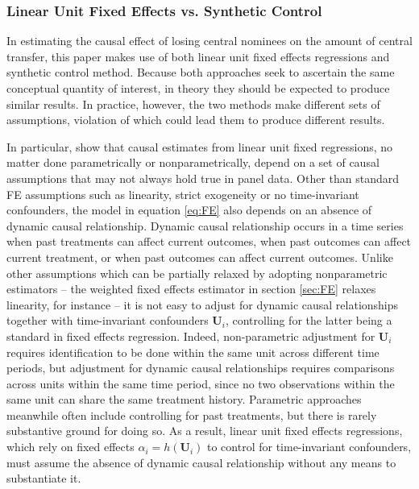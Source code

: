 \documentclass[12pt]{article}\usepackage[]{graphicx}\usepackage[]{color}
\newcommand{\1}{\mathbbm{1}}
\begin{document}
\subsubsection{Linear Unit Fixed Effects vs. Synthetic Control}
\label{sec:vs}
In estimating the causal effect of losing central nominees on the amount of central transfer, this paper makes use of both linear unit fixed effects regressions and synthetic control method. Because both approaches seek to ascertain the same conceptual quantity of interest, in theory they should be expected to produce similar results. In practice, however, the two methods make different sets of assumptions, violation of which could lead them to produce different results.

In particular, \cite{ImaiKim2012} show that causal estimates from linear unit fixed regressions, no matter done parametrically or nonparametrically, depend on a set of causal assumptions that may not always hold true in panel data. Other than standard FE assumptions such as linearity, strict exogeneity or no time-invariant confounders, the model in equation \ref{eq:FE} also depends on an absence of dynamic causal relationship. Dynamic causal relationship occurs in a time series when past treatments can affect current outcomes, when past outcomes can affect current treatment, or when past outcomes can affect current outcomes. Unlike other assumptions which can be partially relaxed by adopting nonparametric estimators -- the weighted fixed effects estimator in section \ref{sec:FE} relaxes linearity, for instance -- it is not easy to adjust for dynamic causal relationships together with time-invariant confounders $\mathbf{U}_i$, controlling for the latter being a standard in fixed effects regression. Indeed, non-parametric adjustment for $\mathbf{U}_i$ requires identification to be done within the same unit across different time periods, but adjustment for dynamic causal relationships requires comparisons across units within the same time period, since no two observations within the same unit can share the same treatment history. Parametric approaches meanwhile often include controlling for past treatments, but there is rarely substantive ground for doing so. As a result, linear unit fixed effects regressions, which rely on fixed effects $\alpha_i = h(\mathbf{U}_i)$ to control for time-invariant confounders, must assume the absence of dynamic causal relationship without any means to substantiate it.
\end{document}
